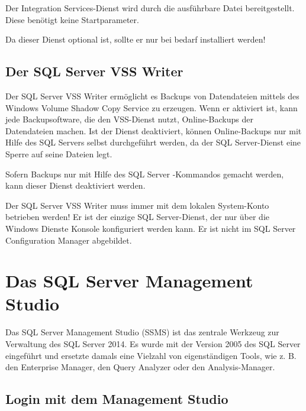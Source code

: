         Der Integration Services-Dienst wird durch die ausführbare Datei
         bereitgestellt. Diese benötigt keine
        Startparameter.
        \begin{merke}
          Da dieser Dienst optional ist, sollte er nur bei bedarf installiert
          werden!
        \end{merke}
      \subsection{Der SQL Server VSS Writer}
        Der SQL Server VSS Writer ermöglicht es Backups von Datendateien mittels
        des Windows Volume Shadow Copy Service zu erzeugen. Wenn er aktiviert ist,
        kann jede Backupsoftware, die den VSS-Dienst nutzt, Online-Backups der
        Datendateien machen. Ist der Dienst deaktiviert, können Online-Backups
        nur mit Hilfe des SQL Servers selbst durchgeführt werden, da der SQL
        Server-Dienst eine Sperre auf seine Dateien legt.
        
        Sofern Backups nur mit Hilfe des SQL Server -Kommandos
        gemacht werden, kann dieser Dienst deaktiviert werden.
        \begin{merke}
          Der SQL Server VSS Writer muss immer mit dem lokalen System-Konto
          betrieben werden! Er ist der einzige SQL Server-Dienst, der nur über
          die Windows Dienste Konsole konfiguriert werden kann. Er ist nicht im SQL Server
          Configuration Manager abgebildet.
        \end{merke}
        \begin{literaturinternet}
          \item \cite{ms175536}
        \end{literaturinternet}       
    \section{Das SQL Server Management Studio}
      Das SQL Server Management Studio (SSMS) ist das zentrale Werkzeug zur
      Verwaltung des SQL Server 2014. Es wurde mit der Version 2005 des SQL Server
      eingeführt und ersetzte damals eine Vielzahl von eigenständigen
      Tools, wie z. B. den Enterprise Manager, den Query Analyzer oder den
      Analysis-Manager.
      \subsection{Login mit dem Management Studio}

